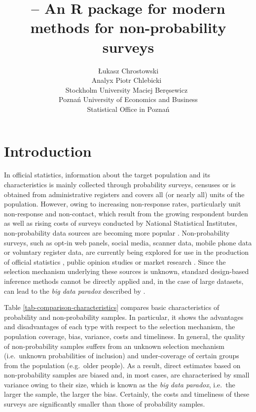 \documentclass[
]{jss}
\author{
Łukasz Chrostowski\\Analyx \And Piotr
Chlebicki~\orcidlink{0009-0006-4867-7434}\\Stockholm University
\AND Maciej Beręsewicz~\orcidlink{0000-0002-8281-4301}\\Poznań
University of Economics and Business\\
Statistical Office in Poznań
}
\title{\pkg{nonprobsvy} -- An R package for modern methods for
non-probability surveys}
\begin{document}
\section{Introduction}\label{sec-introduction}

In official statistics, information about the target population and its
characteristics is mainly collected through probability surveys,
censuses or is obtained from administrative registers and covers all (or
nearly all) units of the population. However, owing to increasing
non-response rates, particularly unit non-response and non-contact,
which result from the growing respondent burden as well as rising costs
of surveys conducted by National Statistical Institutes, non-probability
data sources are becoming more popular
\citep{berkesewicz2017two, beaumont2020probability, biffignandi2021handbook}.
Non-probability surveys, such as opt-in web panels, social media,
scanner data, mobile phone data or voluntary register data, are
currently being explored for use in the production of official
statistics \citep{citro2014multiple, daas2015big}, public opinion
studies \citep{Schonlau2017} or market research \citep[cf.][]{Grow2022}.
Since the selection mechanism underlying these sources is unknown,
standard design-based inference methods cannot be directly applied and,
in the case of large datasets, can lead to the \textit{big data paradox}
described by \citet{meng2018statistical}.

Table \ref{tab-comparison-characteristics} compares basic
characteristics of probability and non-probability samples. In
particular, it shows the advantages and disadvantages of each type with
respect to the selection mechanism, the population coverage, bias,
variance, costs and timeliness. In general, the quality of
non-probability samples suffers from an unknown selection mechanism
(i.e.~unknown probabilities of inclusion) and under-coverage of certain
groups from the population (e.g.~older people). As a result, direct
estimates based on non-probability samples are biased and, in most
cases, are characterised by small variance owing to their size, which is
known as the \textit{big data paradox}, i.e.~the larger the sample, the
larger the bias. Certainly, the costs and timeliness of these surveys
are significantly smaller than those of probability samples.
\end{document}
